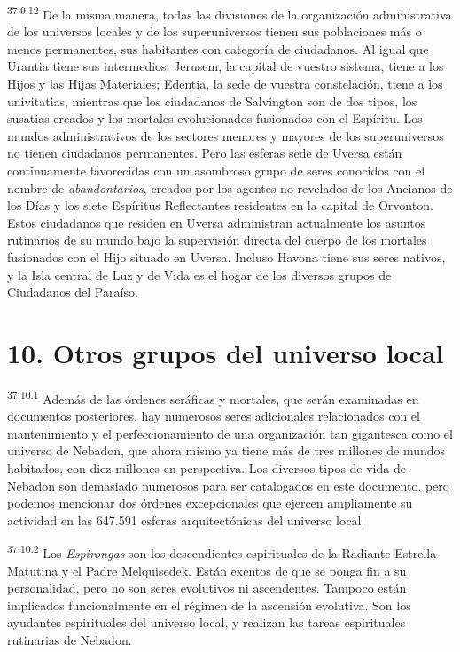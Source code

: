 \par
\textsuperscript{37:9.12} De la misma manera, todas las divisiones de la organización administrativa de los universos locales y de los superuniversos tienen sus poblaciones más o menos permanentes, sus habitantes con categoría de ciudadanos. Al igual que Urantia tiene sus intermedios, Jerusem, la capital de vuestro sistema, tiene a los Hijos y las Hijas Materiales; Edentia, la sede de vuestra constelación, tiene a los univitatias, mientras que los ciudadanos de Salvington son de dos tipos, los susatias creados y los mortales evolucionados fusionados con el Espíritu. Los mundos administrativos de los sectores menores y mayores de los superuniversos no tienen ciudadanos permanentes. Pero las esferas sede de Uversa están continuamente favorecidas con un asombroso grupo de seres conocidos con el nombre de \textit{abandontarios}, creados por los agentes no revelados de los Ancianos de los Días y los siete Espíritus Reflectantes residentes en la capital de Orvonton. Estos ciudadanos que residen en Uversa administran actualmente los asuntos rutinarios de su mundo bajo la supervisión directa del cuerpo de los mortales fusionados con el Hijo situado en Uversa. Incluso Havona tiene sus seres nativos, y la Isla central de Luz y de Vida es el hogar de los diversos grupos de Ciudadanos del Paraíso.

\section*{10. Otros grupos del universo local}
\par
\textsuperscript{37:10.1} Además de las órdenes seráficas y mortales, que serán examinadas en documentos posteriores, hay numerosos seres adicionales relacionados con el mantenimiento y el perfeccionamiento de una organización tan gigantesca como el universo de Nebadon, que ahora mismo ya tiene más de tres millones de mundos habitados, con diez millones en perspectiva. Los diversos tipos de vida de Nebadon son demasiado numerosos para ser catalogados en este documento, pero podemos mencionar dos órdenes excepcionales que ejercen ampliamente su actividad en las 647.591 esferas arquitectónicas del universo local.

\par
\textsuperscript{37:10.2} Los \textit{Espirongas} son los descendientes espirituales de la Radiante Estrella Matutina y el Padre Melquisedek. Están exentos de que se ponga fin a su personalidad, pero no son seres evolutivos ni ascendentes. Tampoco están implicados funcionalmente en el régimen de la ascensión evolutiva. Son los ayudantes espirituales del universo local, y realizan las tareas espirituales rutinarias de Nebadon.

